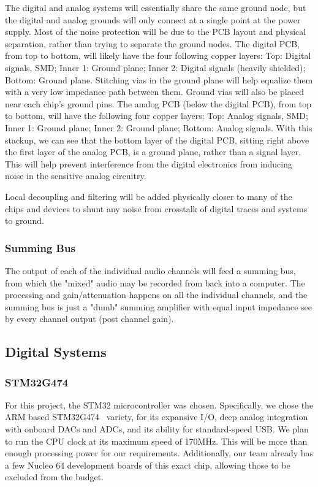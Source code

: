 \documentclass[11pt, letterpaper,titlepage]{article}
\begin{document}
The digital and analog systems will essentially share the same ground node, but the digital and analog grounds will only connect at a single point at the power supply. Most of the noise protection will be due to the PCB layout and physical separation, rather than trying to separate the ground nodes. The digital PCB, from top to bottom, will likely have the four following copper layers: Top: Digital signals, SMD; Inner 1: Ground plane; Inner 2: Digital signals (heavily shielded); Bottom: Ground plane. Stitching vias in the ground plane will help equalize them with a very low impedance path between them. Ground vias will also be placed near each chip's ground pins. The analog PCB (below the digital PCB), from top to bottom, will have the following four copper layers: Top: Analog signals, SMD; Inner 1: Ground plane; Inner 2: Ground plane; Bottom: Analog signals. With this stackup, we can see that the bottom layer of the digital PCB, sitting right above the first layer of the analog PCB, is a ground plane, rather than a signal layer. This will help prevent interference from the digital electronics from inducing noise in the sensitive analog circuitry.

Local decoupling and filtering will be added physically closer to many of the chips and devices to shunt any noise from crosstalk of digital traces and systems to ground.

\subsubsection*{Summing Bus}
The output of each of the individual audio channels will feed a summing bus, from which the "mixed" audio may be recorded from back into a computer. The processing and gain/attenuation happens on all the individual channels, and the summing bus is just a "dumb" summing amplifier with equal input impedance see by every channel output (post channel gain).



\subsection{Digital Systems}
\label{ssec:digital-overview}

\subsubsection*{STM32G474}
For this project, the STM32 microcontroller was chosen. Specifically, we chose the ARM based STM32G474~\cite{stm32g474} variety, for its expansive I/O, deep analog integration with onboard DACs and ADCs, and its ability for standard-speed USB. We plan to run the CPU clock at its maximum speed of 170MHz. This will be more than enough processing power for our requirements. Additionally, our team already has a few Nucleo 64 development boards of this exact chip, allowing those to be excluded from the budget.
\end{document}
